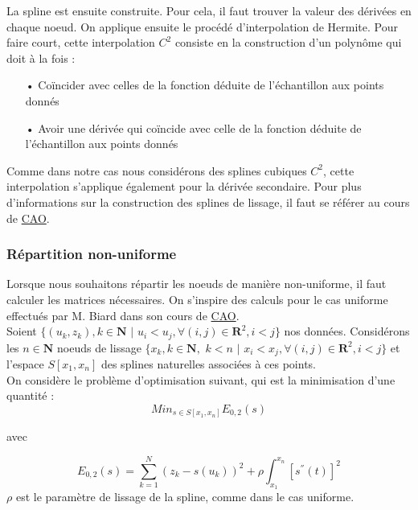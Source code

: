 \documentclass[a4paper,12pt]{article} %
\begin{document}
                La spline est ensuite construite. Pour cela, il faut trouver la valeur des dérivées en chaque noeud. On applique ensuite le procédé d'interpolation de Hermite. Pour faire court, cette interpolation $C^2$ consiste en la construction d'un polynôme qui doit à la fois : 
                \begin{itemize}
                \item[•] Coïncider avec celles de la fonction déduite de l'échantillon aux points donnés
                \item[•] Avoir une dérivée qui coïncide avec celle de la fonction déduite de l'échantillon aux points donnés
                \end{itemize}
                Comme dans notre cas nous considérons des splines cubiques $C^2$, cette interpolation s'applique également pour la dérivée secondaire.
                Pour plus d'informations sur la construction des splines de lissage, il faut se référer au cours de \href{http://www-ljk.imag.fr/membres/Luc.Biard/L3MI_cours/Splines.pdf}{CAO}.
                
            
			\subsubsection{Répartition non-uniforme}
			
			    Lorsque nous souhaitons répartir les noeuds de manière non-uniforme, il faut calculer les matrices nécessaires. On s'inspire des calculs pour le cas uniforme effectués par M. Biard dans son cours de \href{http://www-ljk.imag.fr/membres/Luc.Biard/L3MI_cours/Splines.pdf}{CAO}. \\
			    
			    Soient $\{(u_k,z_k), k\in\mathbf{N}$ $|$ $u_i < u_j, \forall (i,j) \in \mathbf{R}^2, i < j\}$ nos données. Considérons les $n \in \mathbf{N}$ noeuds de lissage $\{x_k, k\in\mathbf{N},$ $k < n$ $|$ $x_i < x_j, \forall (i,j) \in \mathbf{R}^2, i < j\}$
                et l'espace $S[x_1,x_n]$ des splines naturelles associées à ces points. \\
                
                On considère le problème d'optimisation suivant, qui est la minimisation d'une quantité : $$Min_{s \in S[x_1,x_n]}E_{0,2}(s)$$
                \begin{center}
                    avec
                \end{center} $$E_{0,2}(s)=\sum_{k=1}^{N}(z_k-s(u_k))^2+\rho\int_{x_1}^{x_n}[s^{''}(t)]^2$$
                $\rho$ est le paramètre de lissage de la spline, comme dans le cas uniforme.\\
                
\end{document}
